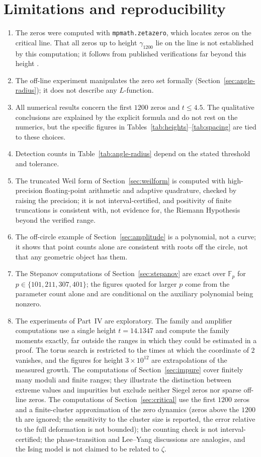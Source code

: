 \documentclass[11pt,a4paper]{article}
\theoremstyle{definition}\newtheorem{definition}[proposition]{Definition}
\theoremstyle{remark}\newtheorem{remark}[proposition]{Remark}
\begin{document}
\section{Limitations and reproducibility}\label{sec:limits}
\begin{enumerate}[label=(\roman*)]
\item The zeros were computed with \texttt{mpmath.zetazero}, which locates zeros on the critical line. That all zeros up to height $\gamma_{1200}$ lie on the line is not established by this computation; it follows from published verifications far beyond this height \cite{PlattTrudgian2021}.
\item The off-line experiment manipulates the zero set formally (Section~\ref{sec:angle-radius}); it does not describe any $L$-function.
\item All numerical results concern the first $1200$ zeros and $t\le4.5$. The qualitative conclusions are explained by the explicit formula and do not rest on the numerics, but the specific figures in Tables~\ref{tab:heights}--\ref{tab:spacing} are tied to these choices.
\item Detection counts in Table~\ref{tab:angle-radius} depend on the stated threshold and tolerance.
\item The truncated Weil form of Section~\ref{sec:weilform} is computed with high-precision floating-point arithmetic and adaptive quadrature, checked by raising the precision; it is not interval-certified, and positivity of finite truncations is consistent with, not evidence for, the Riemann Hypothesis beyond the verified range.
\item The off-circle example of Section~\ref{sec:amplitude} is a polynomial, not a curve; it shows that point counts alone are consistent with roots off the circle, not that any geometric object has them.
\item The Stepanov computations of Section~\ref{sec:stepanov} are exact over $\mathbb F_p$ for $p\in\{101,211,307,401\}$; the figures quoted for larger $p$ come from the parameter count alone and are conditional on the auxiliary polynomial being nonzero.
\item The experiments of Part~IV are exploratory. The family and amplifier computations use a single height $t=14.1347$ and compute the family moments exactly, far outside the ranges in which they could be estimated in a proof. The torus search is restricted to the times at which the coordinate of $2$ vanishes, and the figures for height $3\times10^{12}$ are extrapolations of the measured growth. The computations of Section~\ref{sec:impure} cover finitely many moduli and finite ranges; they illustrate the distinction between extreme values and impurities but exclude neither Siegel zeros nor sparse off-line zeros. The computations of Section~\ref{sec:critical} use the first $1200$ zeros and a finite-cluster approximation of the zero dynamics (zeros above the $1200$th are ignored; the sensitivity to the cluster size is reported, the error relative to the full deformation is not bounded); the counting check is not interval-certified; the phase-transition and Lee--Yang discussions are analogies, and the Ising model is not claimed to be related to $\zeta$.

\end{enumerate}
\end{document}

